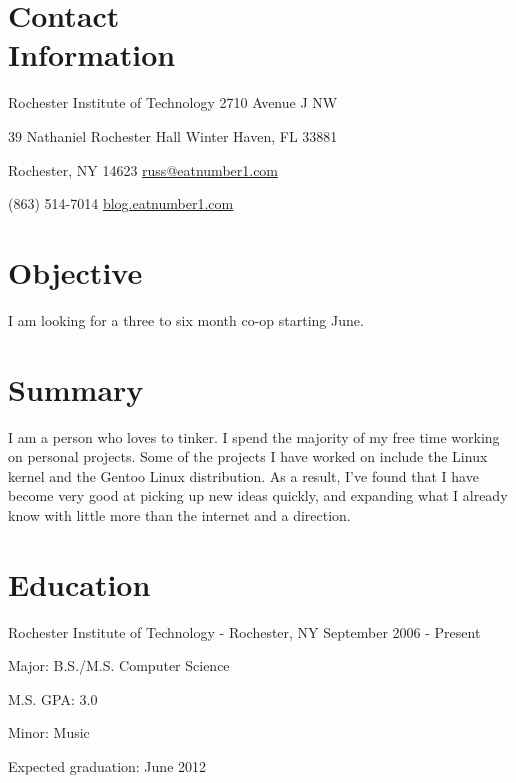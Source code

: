 \documentclass[a4paper,margin,line]{resume}
\newcommand{\rdate}[1]{\hfill {\small #1}}
\begin{document}
\begin{resume}
\section{\mysidestyle Contact \\ Information} \vspace{2mm}
	\begin{asparablank}
		\item Rochester Institute of Technology \hfill 2710 Avenue J NW
		\item 39 Nathaniel Rochester Hall \hfill Winter Haven, FL 33881
		\item Rochester, NY 14623 \hfill
		\href{mailto:russ@eatnumber1.com}{russ@eatnumber1.com}
		\item (863) 514-7014 \hfill
		\href{http://blog.eatnumber1.com/}{blog.eatnumber1.com}
	\end{asparablank}

\section{\mysidestyle Objective}
	I am looking for a three to six month co-op starting June.

\section{\mysidestyle Summary}
	I am a person who loves to tinker. I spend the majority of my free time working on personal projects. Some of the projects I have worked on include the Linux kernel and the Gentoo Linux distribution.  As a result, I've found that I have become very good at picking up new ideas quickly, and expanding what I already know with little more than the internet and a direction.

\section{\mysidestyle Education}
	\begin{compactdesc}
		\item[Rochester Institute of Technology] - Rochester, NY \rdate{September 2006 - Present}
		\begin{compactitem} { \small
			\item Major: B.S./M.S. Computer Science
			\item M.S. GPA: 3.0
			\item Minor: Music
			\item Expected graduation: June 2012
		} \end{compactitem}
	\end{compactdesc}


\end{resume}
\end{document}
